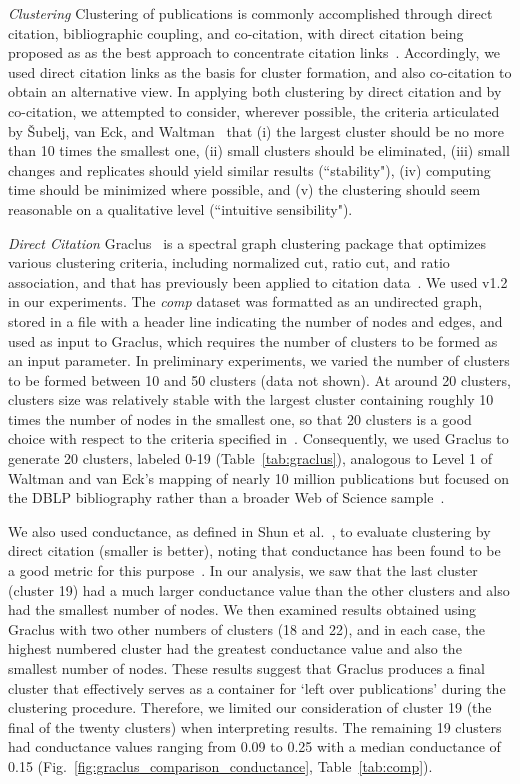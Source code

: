 \emph{Clustering} Clustering of publications is commonly accomplished through direct citation, bibliographic coupling, and co-citation, with direct citation being proposed as as the best approach to concentrate citation links~\cite{klavans_which_2017}. Accordingly, we used direct citation links as the basis for cluster formation, and also co-citation to obtain an alternative view. In applying both clustering by direct citation and by co-citation, we attempted to consider, wherever possible, the criteria articulated by \v{S}ubelj, van Eck, and Waltman~\cite{subelj_clustering_2016} that (i) the largest cluster should be no more than 10 times the smallest one, (ii) small clusters should be eliminated, (iii) small changes and replicates should yield similar results (``stability"),  (iv) computing time should be minimized where possible, and (v) the clustering should seem reasonable on a qualitative level (``intuitive sensibility").

 \emph {Direct Citation} Graclus~\cite{graclus_2007} is a spectral graph clustering package that optimizes  various clustering criteria, including normalized cut, ratio cut, and ratio association, and that has previously been applied to citation data~\cite{subelj_clustering_2016}. 
We used v1.2 in our experiments. The \emph{comp} dataset was formatted as an undirected graph, stored in a file with a header line indicating the number of nodes and edges, and used as input to Graclus, which requires the number of clusters to be formed as an input parameter. In preliminary experiments, we varied the number of clusters to be formed between 10 and 50 clusters (data not shown).  At around 20 clusters, clusters size was relatively stable with the largest cluster containing roughly 10 times the number of nodes in the smallest one,
so that 20 clusters is a good choice with respect to the criteria specified in~\cite{subelj_clustering_2016}. Consequently, we used Graclus to generate 20 clusters, labeled 0-19 (Table~\ref{tab:graclus}), analogous to Level 1 of Waltman and van Eck's mapping of nearly 10 million publications but focused on the DBLP bibliography rather than a broader Web of Science sample~\cite{waltman_new_2012}. 

We also used conductance, as defined in Shun et al.~\cite{shun_parallel_2016}, to  evaluate clustering by direct citation (smaller is better), noting that conductance has been found to be a good metric for this purpose~\cite{emmons2016analysis,almeida_2012}. In our analysis, we saw that the last cluster (cluster 19) had a much larger conductance value than the other clusters and also had the smallest number of nodes. We then examined results obtained using Graclus with two other numbers of clusters (18 and 22), and in each case, the highest numbered cluster had the greatest conductance value and also the smallest number of nodes. These results suggest that Graclus produces a final cluster that effectively serves as a container for `left over publications' during the clustering procedure. Therefore, we limited our consideration of cluster 19 (the final of the twenty clusters)  when interpreting results.  The remaining 19 clusters had conductance values ranging from 0.09 to 0.25 with a median conductance of 0.15 (Fig.~\ref{fig:graclus_comparison_conductance}, Table~\ref{tab:comp}).

